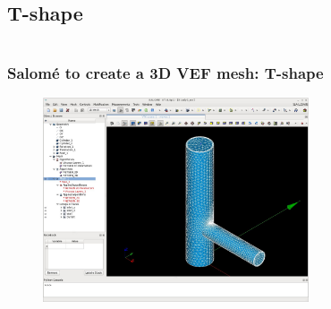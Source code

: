 \documentclass[10pt, hyperref={unicode=true,pdfusetitle, bookmarks=true,bookmarksnumbered=false,bookmarksopen=false, breaklinks=false,pdfborder={0 0 1},backref=true,colorlinks=true,linkcolor=darkblue,pageanchor}]{beamer}
\begin{document}
\subsection{T-shape}
\begin{frame}
\begin{columns}[c] 
\tableofcontents[sections={1-9},currentsection, currentsubsection]
\tableofcontents[sections={10-16},currentsection, currentsubsection]
\end{columns}
\end{frame}
\begin{frame}
\frametitle{Salom\'e to create a 3D VEF mesh: T-shape}

\begin{figure}
\includegraphics[width=0.7\textwidth]{PICTURES/salome17.jpg}
\end{figure}

\end{frame}
\end{document}
